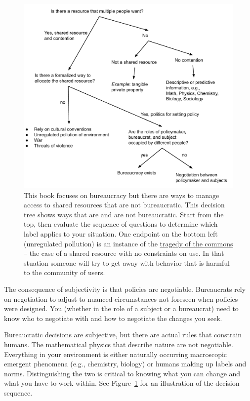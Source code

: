 \begin{figure}
    \centering
    \includegraphics[width=1.05\textwidth]{images/relation_between_shared_resource_and_bureaucarcy.pdf}
    \caption{This book focuses on bureaucracy but there are ways to manage access to shared resources that are not bureaucratic.  
    This decision tree shows ways that are and are not bureaucratic. Start from the top, then evaluate the sequence of questions to determine which label applies to your situation.
    One endpoint on the bottom left (unregulated pollution) is an instance of 
    the 
    \href{https://en.wikipedia.org/wiki/Tragedy_of_the_commons}{tragedy of the commons}  
    -- the case of a shared resource with no constraints on use. In that stuation someone will try to get away with behavior that is harmful to the community of users.}
    \label{fig:am-I-a-bureaucrat}
\end{figure}

The consequence of subjectivity is that policies are negotiable. Bureaucrats rely on negotiation to adjust to nuanced circumstances not foreseen when policies were designed.  You (whether in the role of a subject or a bureaucrat) need to know who to negotiate with and how to negotiate the changes you seek. 

Bureaucratic decisions are subjective, but there are actual rules that constrain humans. The mathematical physics that describe nature are not negotiable. Everything in your environment is either naturally occurring macroscopic emergent phenomena (e.g., chemistry, biology) or humans making up labels and norms. Distinguishing the two is critical to knowing what you can change and what you have to work within. See Figure~\ref{fig:am-I-a-bureaucrat}\iftoggle{haspagenumbers}{ on page~\pageref{fig:am-I-a-bureaucrat}}{ } for an illustration of the decision sequence.

